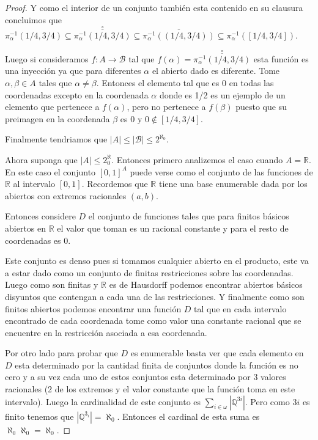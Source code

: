 \documentclass[paper=letter, fontsize=11pt]{scrartcl} %
\numberwithin{equation}{section} %
\numberwithin{figure}{section} %
\numberwithin{table}{section} %
\begin{document}
\begin{enumerate}
\begin{proof}
Y como el interior de un conjunto también esta contenido en su clausura concluimos que $ \pi_\alpha^{-1}(1/4,3/4) \subseteq \overset{\circ}{\overline{\pi_\alpha^{-1}(1/4,3/4)}} \subseteq \overline{\pi^{-1}_\alpha((1/4,3/4))} \subseteq \pi_\alpha^{-1}([1/4,3/4]) $.

Luego si consideramos $ f: A \to \mathcal{B} $ tal que $ f(\alpha) = \overset{\circ}{\overline{\pi_\alpha^{-1}(1/4,3/4)}} $ esta función es una inyección ya que para diferentes $ \alpha $ el abierto dado es diferente. Tome $ \alpha, \beta \in A $ tales que $ \alpha \not = \beta $. Entonces el elemento tal que es $ 0 $ en todas las coordenadas excepto en la coordenada $ \alpha $ donde es 1/2 es un ejemplo de un elemento que pertenece a $ f(\alpha) $, pero no pertenece a $ f(\beta) $ puesto que su preimagen en la coordenada $ \beta $ es 0 y $ 0 \not \in [1/4,3/4] $.

Finalmente tendriamos que $ |A|\leq |\mathcal{B}|\leq 2^{\aleph_0} $.

Ahora suponga que $ |A| \leq 2^\aleph_0 $. Entonces primero analizemos el caso cuando $ A = \mathbb{R} $. En este caso el conjunto $ [0,1]^A $ puede verse como el conjunto de las funciones de $ \mathbb{R} $ al intervalo  $ [0,1]  $. Recordemos que $ \mathbb{R} $ tiene una base enumerable dada por los abiertos con extremos racionales $ (a,b) $.

Entonces considere $ D $ el conjunto de funciones tales que para finitos básicos abiertos en $ \mathbb{R} $ el valor que toman es un racional constante y para el resto de coordenadas es 0.

Este conjunto es denso pues si tomamos cualquier abierto en el producto, este va a estar dado como un conjunto de finitas restricciones sobre las coordenadas. Luego como son finitas y $ \mathbb{R} $ es de Hausdorff podemos encontrar abiertos básicos disyuntos que contengan a cada una de las restricciones. Y finalmente como son finitos abiertos podemos encontrar una función $ D $ tal que en cada intervalo encontrado de cada coordenada tome como valor una constante racional que se encuentre en la restricción asociada a esa coordenada.

Por otro lado para probar que $ D $ es enumerable basta ver que cada elemento en $ D $ esta determinado por la cantidad finita de conjuntos donde la función es no cero y a su vez cada uno de estos conjuntos esta determinado por 3 valores racionales (2 de los extremos y el valor constante que la función toma en este intervalo). Luego la cardinalidad de este conjunto es $ \displaystyle \sum_{i \in \omega} |\mathbb{Q}^{3i}|  $. Pero como $ 3i $ es finito tenemos que $ |\mathbb{Q}^{3_i}| = \aleph_0 $. Entonces el cardinal de esta suma es $ \aleph_0\aleph_0 = \aleph_0 $.


\end{proof}
\end{enumerate}
\end{document}
